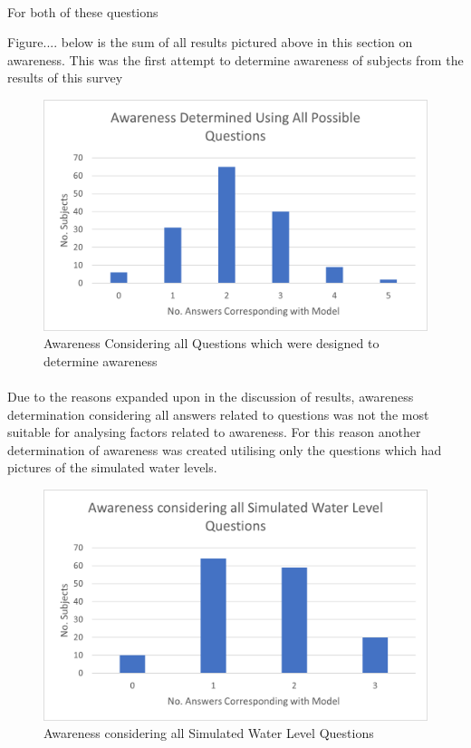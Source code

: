 \paragraph{}

For both of these questions 

Figure.... below is the sum of all results pictured above in this section on awareness. This was the first attempt to determine awareness of subjects from the results of this survey

\begin{figure}[h]
    \centering
    \includegraphics{fig_results/aware_all.png}
    \caption{Awareness Considering all Questions which were designed to determine awareness}
    \label{fig:aware-all}
\end{figure}
\paragraph{}

Due to the reasons expanded upon in the discussion of results, awareness determination considering all answers related to questions was not the most suitable for analysing factors related to awareness. For this reason another determination of awareness was created utilising only the questions which had pictures of the simulated water levels. 

\begin{figure}[h!]
    \centering
    \includegraphics{fig_results/Awareness_ all_simulation_pictures_qs.png}
    \caption{Awareness considering all Simulated Water Level Questions}
    \label{fig:aware_all}
\end{figure}

